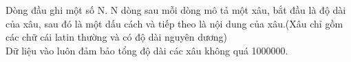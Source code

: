 Dòng đầu ghi một số N. N dòng sau mỗi dòng mô tả một xâu, bắt đầu là độ dài của xâu, sau đó là một dấu cách và tiếp theo là nội dung của xâu.(Xâu chỉ gồm các chữ cái latin thường và có độ dài nguyên dương)   
\\   Dữ liệu vào luôn đảm bảo tổng độ dài các xâu không quá 1000000.  

\